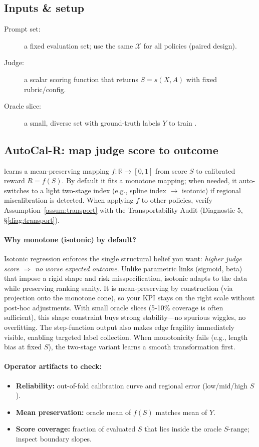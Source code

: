 \subsection{Inputs \& setup}

\begin{description}
\item[Prompt set:] a fixed evaluation set; use the same $\mathcal{X}$ for all policies (paired design).
\item[Judge:] a scalar scoring function that returns $S = s(X, A)$ with fixed rubric/config.
\item[Oracle slice:] a small, diverse set with ground-truth labels $Y$ to train \autocal.
\end{description}

\subsection{AutoCal-R: map judge score to outcome}

\autocal{} learns a mean-preserving mapping $f: \mathbb{R} \to [0,1]$ from score $S$ to calibrated reward $R = f(S)$. By default it fits a monotone mapping; when needed, it auto-switches to a light two-stage index (e.g., spline index $\to$ isotonic) if regional miscalibration is detected. When applying $f$ to other policies, verify Assumption~\ref{assum:transport} with the Transportability Audit (Diagnostic 5, \S\ref{diag:transport}).

\paragraph{Why monotone (isotonic) by default?} Isotonic regression enforces the single structural belief you want: \emph{higher judge score $\Rightarrow$ no worse expected outcome}. Unlike parametric links (sigmoid, beta) that impose a rigid shape and risk misspecification, isotonic adapts to the data while preserving ranking sanity. It is mean-preserving by construction (via projection onto the monotone cone), so your KPI stays on the right scale without post-hoc adjustments. With small oracle slices (5-10\% coverage is often sufficient), this shape constraint buys strong stability---no spurious wiggles, no overfitting. The step-function output also makes edge fragility immediately visible, enabling targeted label collection. When monotonicity fails (e.g., length bias at fixed $S$), the two-stage variant learns a smooth transformation first.

\paragraph{Operator artifacts to check:}
\begin{itemize}
\item \textbf{Reliability:} out-of-fold calibration curve and regional error (low/mid/high $S$).
\item \textbf{Mean preservation:} oracle mean of $f(S)$ matches mean of $Y$.
\item \textbf{Score coverage:} fraction of evaluated $S$ that lies inside the oracle $S$-range; inspect boundary slopes.
\end{itemize}

